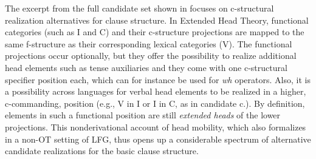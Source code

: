 \documentclass[output=paper,hidelinks]{langscibook}
\begin{document}
The excerpt from the full candidate set shown in  focuses on c-struc\-tural realization alternatives for clause structure. In Extended Head Theory, functional categories (such as I and C) and their c-structure projections are mapped to the same f-structure as their corresponding lexical categories (V). The functional projections occur optionally, but they offer the possibility to realize additional head elements such as tense auxiliaries and they come with one c-structural specifier position each, which can for instance be used for \emph{wh} operators.
Also, it is a possibility across languages for verbal head elements to be realized in a higher, c-commanding, position (e.g., V in I or I in C, as in candidate c.). By definition, elements in such a functional position are still \emph{extended heads} of the lower projections. 
This nonderivational account of head mobility, which \citet[ch.~7]{bresnan2001lexical} also formalizes in a non-OT setting of LFG,  thus opens up a considerable spectrum of alternative candidate realizations for the basic clause structure. 
\end{document}
